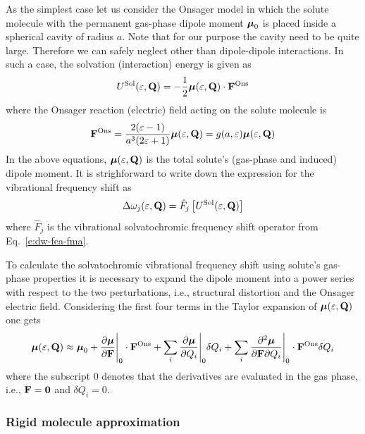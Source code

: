 \documentclass[a4paper,titlepage,twoside,fleqn,12pt]{book}
\newcommand{\BM}[1]{\ensuremath{\mbox{\boldmath${#1}$}}}
\newcommand{\fderiv}[2]{\ensuremath{
\frac{\partial #1}{\partial #2}}}
\newcommand{\sderivd}[3]{\ensuremath{
\frac{\partial^2 #1}{\partial #2 \partial #3}
}}
\begin{document}
\begin{refsection}
As the simplest case let us consider the Onsager model
in which the solute molecule with the permanent gas\hyp{}phase 
dipole moment ${\BM \mu}_0$
is placed inside a spherical cavity of radius $a$. Note that
for our purpose the cavity need to be quite large. Therefore 
we can safely neglect other than dipole\hyp{}dipole interactions.
In such a case, the solvation (interaction) energy is given as
%
\begin{equation} \label{e:esol-onsager}
 U^{\rm Sol}(\varepsilon, {\bf Q}) =
 -\frac{1}{2} {\BM \mu}(\varepsilon, {\bf Q}) \cdot {\bf F}^{\rm Ons}
\end{equation}
%
where the Onsager reaction (electric) field acting on the solute molecule
is
%
\begin{equation} \label{e:fons}
  {\bf F}^{\rm Ons} = \frac{2(\varepsilon-1)}{a^3(2\varepsilon+1)} {\BM \mu}(\varepsilon, {\bf Q})
 = g(a,\varepsilon) {\BM \mu}(\varepsilon, {\bf Q})
\end{equation}
%
In the above equations, ${\BM \mu}(\varepsilon, {\bf Q})$ 
is the total solute's (gas\hyp{}phase and induced) dipole moment.
It is strighforward to write down the expression for the
vibrational frequency shift as
%
\begin{equation} \label{e:dw-ons-gen}
  \Delta\omega_j(\varepsilon, {\bf Q}) = \hat{F}_j \left[ U^{\rm Sol}(\varepsilon, {\bf Q}) \right]
\end{equation}
%
where $\hat{F}_j$ is the vibrational solvatochromic frequency shift 
operator from Eq.~\eqref{e:dw-fea-fma}.

To calculate the solvatochromic vibrational frequency shift
using solute's gas\hyp{}phase properties it is necessary to expand
the dipole moment into a power series with respect to the two perturbations,
i.e., structural distortion and the Onsager electric field. Considering the first
four terms in the Taylor expansion of ${\BM \mu}(\varepsilon, {\bf Q})$ one gets
%
\begin{equation} \label{e:mu-qf}
 {\BM \mu}(\varepsilon, {\bf Q}) \approx 
 {\BM \mu}_0 + \fderiv{{\BM \mu}}{\bf F}\Bigg|_{0}  \cdot {\bf F}^{\rm Ons}
 + \sum_i \fderiv{{\BM \mu}}{Q_i}\Bigg|_{0} \delta Q_i 
 + \sum_i \sderivd{{\BM \mu}}{{\bf F}}{Q_i}\Bigg|_{0} \cdot {\bf F}^{\rm Ons} \delta Q_i
\end{equation}
%
where the subscript $0$ denotes that the derivatives are evaluated in the gas phase,
i.e., ${\bf F}={\bf 0}$ and $\delta Q_i=0$.

\subsubsection{Rigid molecule approximation}


\end{refsection}
\end{document}
